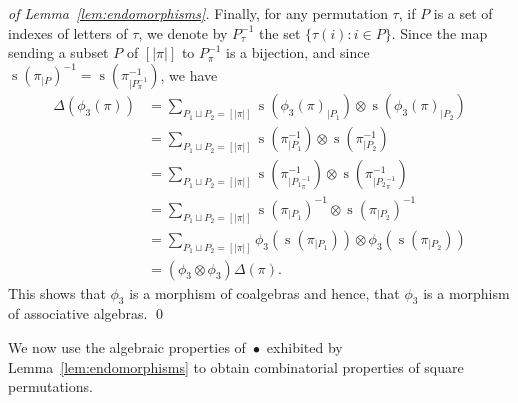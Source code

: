 \documentclass[a4paper]{llncs}
\DeclareMathOperator{\STD}{\mathrm{s}}
\DeclareMathOperator{\SHUFFLE}{\bullet}
\begin{document}
\begin{proof}[of Lemma~\ref{lem:endomorphisms}]
    Finally, for any permutation $\tau$, if $P$ is a set of indexes of
    letters of $\tau$, we denote by $P_\tau^{-1}$ the set
    $\{\tau(i) : i \in P\}$. Since the map sending a subset $P$ of
    $[|\pi|]$ to $P_\pi^{-1}$ is a bijection, and since
    $\STD\left(\pi_{|P}\right)^{-1} = \STD\left(\pi^{-1}_{|P_\pi^{-1}}\right)$,
    we have
    \begin{equation} \begin{split}
        \Delta(\phi_3(\pi))
        & = \sum_{P_1 \sqcup P_2 = [|\pi|]}
        \STD\left(\phi_3(\pi)_{|P_1}\right)
        \otimes \STD\left(\phi_3(\pi)_{|P_2}\right) \\
        & = \sum_{P_1 \sqcup P_2 = [|\pi|]}
        \STD\left(\pi^{-1}_{|P_1}\right)
        \otimes \STD\left(\pi^{-1}_{|P_2}\right) \\
        & = \sum_{P_1 \sqcup P_2 = [|\pi|]}
        \STD\left(\pi^{-1}_{|{P_1}_\pi^{-1}}\right)
        \otimes \STD\left(\pi^{-1}_{|{P_2}_\pi^{-1}}\right) \\
        & = \sum_{P_1 \sqcup P_2 = [|\pi|]}
        \STD\left(\pi_{|P_1}\right)^{-1}
        \otimes \STD\left(\pi_{|P_2}\right)^{-1} \\
        & = \sum_{P_1 \sqcup P_2 = [|\pi|]}
        \phi_3\left(\STD\left(\pi_{|P_1}\right)\right)
        \otimes \phi_3\left(\STD\left(\pi_{|P_2}\right)\right) \\
        & = (\phi_3 \otimes \phi_3) \Delta(\pi).
    \end{split} \end{equation}
    This shows that $\phi_3$ is a morphism of coalgebras and hence, that
    $\phi_3$ is a morphism of associative algebras.
    \qed
\end{proof}
\medskip

We now use the algebraic properties of $\SHUFFLE$ exhibited by
Lemma~\ref{lem:endomorphisms} to obtain combinatorial properties
of square permutations.
\medskip
\end{document}
